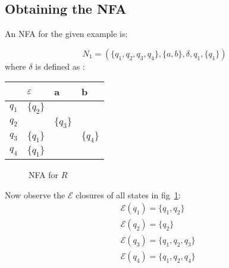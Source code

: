 \subsection*{Obtaining the NFA}
An NFA for the given example is:

$$
N_1 = (\{q_1,q_2, q_3, q_4\}, \{a,b\}, \delta, q_1, \{q_1\})
$$
where $\delta$ is defined as : 

\begin{tabular}{|l|l|l|l|}
\hline
     & $\varepsilon$ & a        & b        \\\hline
$q_1$ & $\{q_2\}$                   &          &          \\
$q_2$ &                            & $\{q_3\}$ &          \\
$q_3$ & $\{q_1\}$                   &          & $\{q_4\}$ \\
$q_4$ & $\{q_1\}$                   &          &        \\ \hline
\end{tabular}

\begin{figure}[ht]
\centering
{}
\caption{NFA for $R$}
\label{fig:nfa}
\end{figure}

Now observe the $\mathcal{E}$ closures of all states in fig~\ref{fig:nfa}:
\begin{equation}
\label{eq:closure}
\begin{split}
&\mathcal{E} (q_1) = \{q_1, q_2\} \\
&\mathcal{E} (q_2) = \{q_2\} \\
&\mathcal{E} (q_3) = \{q_1, q_2, q_3\} \\
&\mathcal{E} (q_4) = \{q_1, q_2, q_4\} \\
\end{split}
\end{equation}
